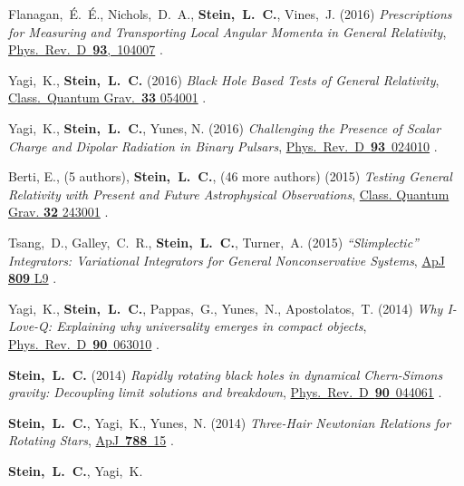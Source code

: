 \begin{etaremune}[start=\value{pubCounter}]
\item
  Flanagan,~\'E.~\'E., Nichols,~D.~A., {\bf Stein,~L.~C.}, Vines,~J.
  (2016)
  {\it Prescriptions for Measuring and Transporting Local Angular
    Momenta in General Relativity},
  \href{http://dx.doi.org/10.1103/PhysRevD.93.104007}{Phys.~Rev.~D~{\bf 93},~104007}
  .
\item
  Yagi,~K., {\bf Stein,~L.~C.}
  (2016)
  {\it Black Hole Based Tests of General Relativity},
  \href{http://dx.doi.org/10.1088/0264-9381/33/5/054001}{Class.~Quantum Grav.~{\bf 33} 054001}
  .
\item
  Yagi,~K., {\bf Stein,~L.~C.}, Yunes, N.
  (2016)
  {\it Challenging the Presence of Scalar Charge and Dipolar Radiation
    in Binary Pulsars},
  \href{http://dx.doi.org/doi:10.1103/PhysRevD.93.024010}{Phys.~Rev.~D~{\bf 93}~024010}
  .
\item
  Berti, E., (5 authors), {\bf Stein,~L.~C.}, (46 more authors)
  (2015)
  {\it Testing General Relativity with Present and Future
    Astrophysical Observations},
  \href{http://dx.doi.org/10.1088/0264-9381/32/24/243001}{Class. Quantum Grav. {\bf 32} 243001}
  .
\item
  Tsang,~D., Galley,~C.~R., {\bf Stein,~L.~C.}, Turner,~A.
  (2015)
  {\it ``Slimplectic'' Integrators: Variational Integrators for General Nonconservative Systems},
  \href{http://dx.doi.org/10.1088/2041-8205/809/1/L9}{ApJ {\bf 809} L9}
  .
\item
  Yagi,~K., {\bf Stein,~L.~C.}, Pappas,~G., Yunes,~N., Apostolatos,~T.
  (2014)
  {\it Why I-Love-Q: Explaining why universality emerges in compact objects},
  \href{http://dx.doi.org/10.1103/PhysRevD.90.063010}{Phys.~Rev.~D~{\bf 90}~063010}
  .
\item
  {\bf Stein,~L.~C.}
  (2014)
  {\it Rapidly rotating black holes in dynamical Chern-Simons gravity:
    Decoupling limit solutions and breakdown},
  \href{http://dx.doi.org/10.1103/PhysRevD.90.044061}{Phys.~Rev.~D~{\bf 90}~044061}
  .
\item
  {\bf Stein,~L.~C.}, Yagi,~K., Yunes,~N.
  (2014)
  {\it Three-Hair Newtonian Relations for Rotating Stars},
  \href{http://dx.doi.org/10.1088/0004-637X/788/1/15}{ApJ~{\bf 788}~15}
  .
\item
  {\bf Stein,~L.~C.}, Yagi,~K.

\end{etaremune}
